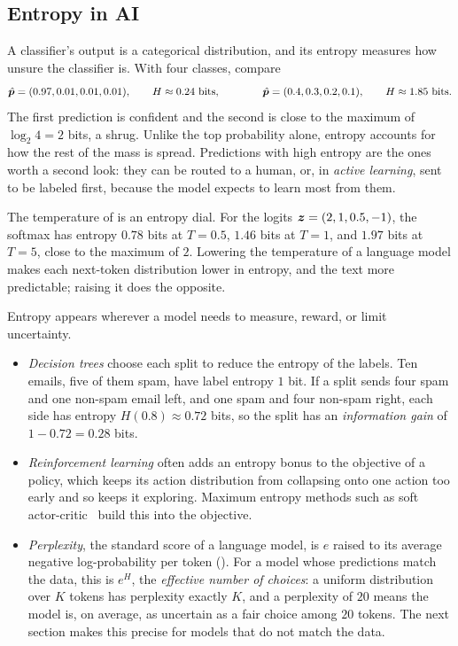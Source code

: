 \subsection{Entropy in AI}
\label{sec:ch07-entropy-ai}

A classifier's output is a categorical distribution, and its entropy
measures how unsure the classifier is. With four classes, compare
\[
  \hat{\bm{p}} = (0.97, 0.01, 0.01, 0.01),
  \qquad H \approx 0.24 \text{ bits},
  \qquad\qquad
  \hat{\bm{p}} = (0.4, 0.3, 0.2, 0.1),
  \qquad H \approx 1.85 \text{ bits}.
\]
The first prediction is confident and the second is close to the maximum
of $\log_2 4 = 2$ bits, a shrug. Unlike the top probability alone,
entropy accounts for how the rest of the mass is spread. Predictions with
high entropy are the ones worth a second look: they can be routed to a
human, or, in \emph{active learning}, sent to be labeled first, because
the model expects to learn most from them.

The temperature of  is an entropy dial. For the
logits $\bm{z} = (2, 1, 0.5, -1)$, the softmax has entropy $0.78$ bits
at $T = 0.5$, $1.46$ bits at $T = 1$, and $1.97$ bits at $T = 5$, close
to the maximum of $2$. Lowering the temperature of a language model makes
each next-token distribution lower in entropy, and the text more
predictable; raising it does the opposite.

\begin{aibox}
  Entropy appears wherever a model needs to measure, reward, or limit
  uncertainty.
  \begin{itemize}
    \item \emph{Decision trees} choose each split to reduce the entropy of
      the labels. Ten emails, five of them spam, have label entropy $1$
      bit. If a split sends four spam and one non-spam email left, and one
      spam and four non-spam right, each side has entropy $H(0.8) \approx
      0.72$ bits, so the split has an \emph{information gain} of $1 - 0.72
      = 0.28$ bits.
    \item \emph{Reinforcement learning} often adds an entropy bonus to
      the objective of a policy, which keeps its action distribution from
      collapsing onto one action too early and so keeps it exploring.
      Maximum entropy methods such as soft
      actor-critic~\cite{haarnoja2018sac} build this into the objective.
    \item \emph{Perplexity}, the standard score of a language model, is
      $e$ raised to its average negative log-probability per token
      (). For a model whose predictions match the
      data, this is $e^{H}$, the \emph{effective number of choices}: a
      uniform distribution over $K$ tokens has perplexity exactly $K$, and
      a perplexity of $20$ means the model is, on average, as uncertain as
      a fair choice among $20$ tokens. The next section makes this
      precise for models that do not match the data.
  \end{itemize}
\end{aibox}

